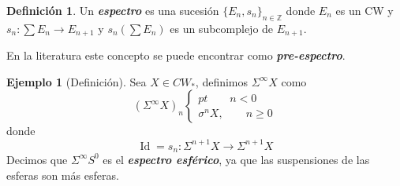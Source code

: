 \documentclass[spanish]{book}
\theoremstyle{definition}
\newtheorem*{defn}{Definición}
\newtheorem*{ejem}{Ejemplo}
\newcommand{\Z}{\mathbb{Z}}
\DeclareMathOperator{\Id}{Id}
\begin{document}
	\begin{defn}
		Un \textbf{\textit{espectro}} es una sucesión $\{E_n,s_n\}_{n\in\Z}$ donde $E_n$ es un CW y $s_n:\sum E_n\to E_{n+1}$ y $s_n(\sum E_n)$ es un subcomplejo de $E_{n+1}$.
	\end{defn}
	En la literatura este concepto se puede encontrar como \textbf{\textit{pre-espectro}}.

	\begin{ejem}[Definición]
		Sea $X\in CW_*$, definimos $\Sigma^\infty X$ como
		\[(\Sigma^\infty X)_n\begin{cases}
			pt\qquad n<0\\
			\sigma^nX,\qquad n\geq0
		\end{cases}\]
		donde
		\[\Id=s_n:\Sigma^{n+1}X\to\Sigma^{n+1}X\]
		Decimos que $\Sigma^\infty S^0$ es el \textbf{\textit{espectro esférico}}, ya que las suspensiones de las esferas son más esferas.
	\end{ejem}
\end{document}
